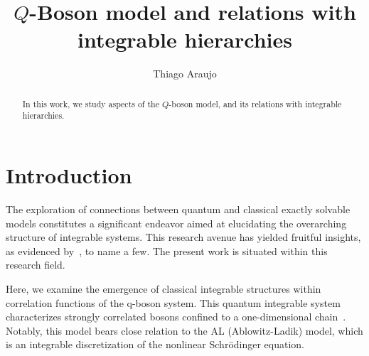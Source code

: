 \documentclass[a4paper,11pt]{amsart}
\begin{document}

\title{\(Q\)-Boson model and relations with integrable hierarchies}

\author{Thiago Araujo}

\address{\noindent 
Instituto de Física Teórica, UNESP-Universidade Estadual Paulista,
R. Dr. Bento T. Ferraz 271, Bl. II, Sao Paulo 01140-070, SP, Brazil\\
\&\\
Instituto de Física, Universidade de S\~ao Paulo,
Rua do Matão Travessa 1371, 05508-090 São Paulo, SP. Brazil
}


\begin{abstract}
In this work, we study aspects of the \(Q\)-boson model, and 
its relations with integrable hierarchies. 
\end{abstract}

\maketitle

\setcounter{tocdepth}{2}
\tableofcontents





\section{Introduction}

The exploration of connections between quantum and classical
exactly solvable models constitutes a significant endeavor aimed at
elucidating the overarching structure of integrable systems.  This
research avenue has yielded fruitful insights, as evidenced
by~\cite{Its:1992bj, Foda:2009zz, Alexandrov:2011aa, Araujo:2021ghu},
to name a few.  The present work is situated within this research field.

Here, we examine the emergence of classical integrable structures
within correlation functions of the q-boson system. This quantum
integrable system characterizes strongly correlated bosons confined to
a one-dimensional chain~\cite{Bogoliubov:1992, Bogoliubov:1997soj,
  Bogoliubov2005}. Notably, this model bears close relation to the AL
(Ablowitz-Ladik) model, which is an integrable discretization of the
nonlinear Schrödinger equation.
\end{document}
